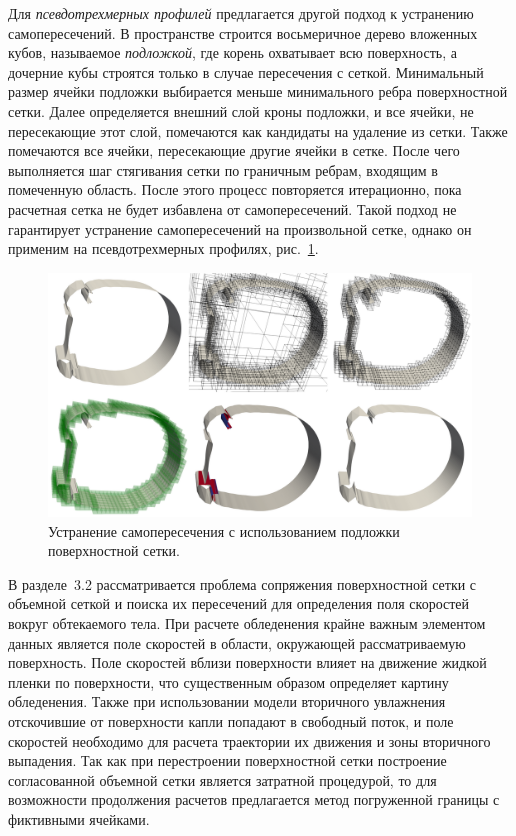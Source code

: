 \documentclass[a4paper,14pt]{extarticle}                     %
\theoremstyle{plain}                                         %
\begin{document}
Для \textit{псевдотрехмерных профилей} предлагается другой подход к устранению самопересечений.
В пространстве строится восьмеричное дерево вложенных кубов, называемое \textit{подложкой}, где корень охватывает всю поверхность, а дочерние кубы строятся только в случае пересечения с сеткой.
Минимальный размер ячейки подложки выбирается меньше минимального ребра поверхностной сетки.
Далее определяется внешний слой кроны подложки, и все ячейки, не пересекающие этот слой, помечаются как кандидаты на удаление из сетки.
Также помечаются все ячейки, пересекающие другие ячейки в сетке.
После чего выполняется шаг стягивания сетки по граничным ребрам, входящим в помеченную область.
После этого процесс повторяется итерационно, пока расчетная сетка не будет избавлена от самопересечений.
Такой подход не гарантирует устранение самопересечений на произвольной сетке, однако он применим на псевдотрехмерных профилях, рис.~\ref{fig:text_1_int_2}.

\begin{figure}[!ht]
\centering
\includegraphics[width=1.0\textwidth]{fig/int_wing_all.png}
\singlespacing
\caption{Устранение самопересечения с использованием подложки поверхностной сетки.}
\label{fig:text_1_int_2}
\end{figure}


В разделе~3.2 рассматривается проблема сопряжения поверхностной сетки с объемной сеткой и поиска их пересечений для определения поля скоростей вокруг обтекаемого тела.
При расчете обледенения крайне важным элементом данных является поле скоростей в области, окружающей рассматриваемую поверхность.
Поле скоростей вблизи поверхности влияет на движение жидкой пленки по поверхности, что существенным образом определяет картину обледенения.
Также при использовании модели вторичного увлажнения отскочившие от поверхности капли попадают в свободный поток, и поле скоростей необходимо для расчета траектории их движения и зоны вторичного выпадения.
Так как при перестроении поверхностной сетки построение согласованной объемной сетки является затратной процедурой, то для возможности продолжения расчетов предлагается метод погруженной границы с фиктивными ячейками.
\end{document}
